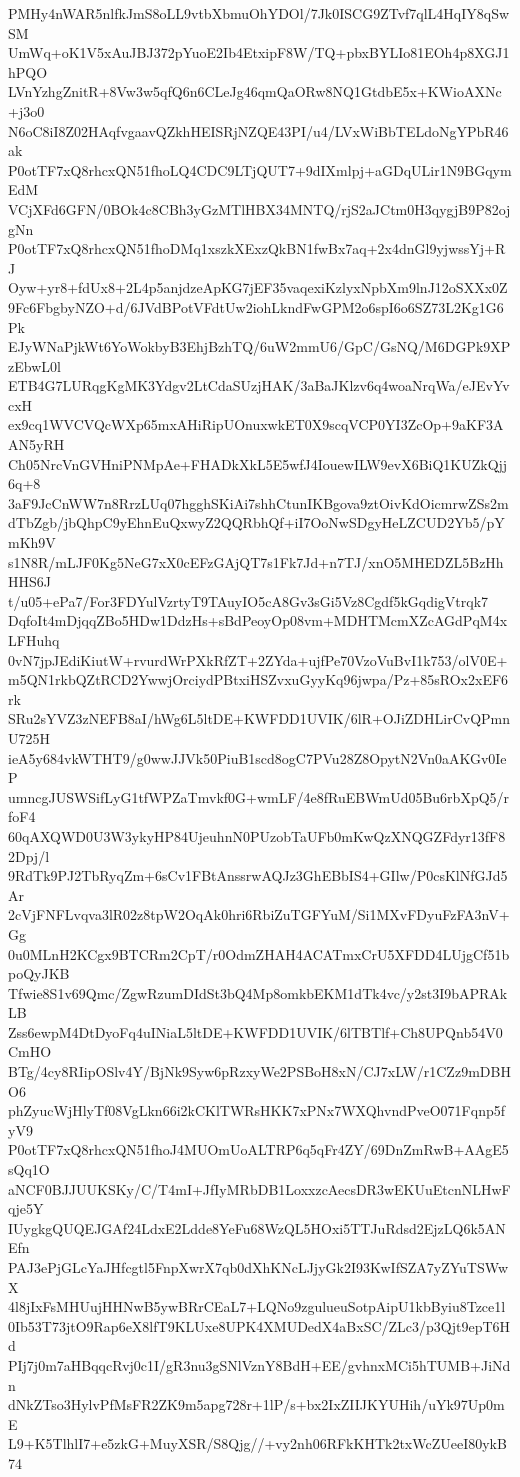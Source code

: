 PMHy4nWAR5nlfkJmS8oLL9vtbXbmuOhYDOl/7Jk0ISCG9ZTvf7qlL4HqIY8qSwSM
UmWq+oK1V5xAuJBJ372pYuoE2Ib4EtxipF8W/TQ+pbxBYLIo81EOh4p8XGJ1hPQO
LVnYzhgZnitR+8Vw3w5qfQ6n6CLeJg46qmQaORw8NQ1GtdbE5x+KWioAXNc+j3o0
N6oC8iI8Z02HAqfvgaavQZkhHEISRjNZQE43PI/u4/LVxWiBbTELdoNgYPbR46ak
P0otTF7xQ8rhcxQN51fhoLQ4CDC9LTjQUT7+9dIXmlpj+aGDqULir1N9BGqymEdM
VCjXFd6GFN/0BOk4c8CBh3yGzMTlHBX34MNTQ/rjS2aJCtm0H3qygjB9P82ojgNn
P0otTF7xQ8rhcxQN51fhoDMq1xszkXExzQkBN1fwBx7aq+2x4dnGl9yjwssYj+RJ
Oyw+yr8+fdUx8+2L4p5anjdzeApKG7jEF35vaqexiKzlyxNpbXm9lnJ12oSXXx0Z
9Fc6FbgbyNZO+d/6JVdBPotVFdtUw2iohLkndFwGPM2o6spI6o6SZ73L2Kg1G6Pk
EJyWNaPjkWt6YoWokbyB3EhjBzhTQ/6uW2mmU6/GpC/GsNQ/M6DGPk9XPzEbwL0l
ETB4G7LURqgKgMK3Ydgv2LtCdaSUzjHAK/3aBaJKlzv6q4woaNrqWa/eJEvYvcxH
ex9cq1WVCVQcWXp65mxAHiRipUOnuxwkET0X9scqVCP0YI3ZcOp+9aKF3AAN5yRH
Ch05NrcVnGVHniPNMpAe+FHADkXkL5E5wfJ4IouewILW9evX6BiQ1KUZkQjj6q+8
3aF9JcCnWW7n8RrzLUq07hgghSKiAi7shhCtunIKBgova9ztOivKdOicmrwZSs2m
dTbZgb/jbQhpC9yEhnEuQxwyZ2QQRbhQf+iI7OoNwSDgyHeLZCUD2Yb5/pYmKh9V
s1N8R/mLJF0Kg5NeG7xX0cEFzGAjQT7s1Fk7Jd+n7TJ/xnO5MHEDZL5BzHhHHS6J
t/u05+ePa7/For3FDYulVzrtyT9TAuyIO5cA8Gv3sGi5Vz8Cgdf5kGqdigVtrqk7
DqfoIt4mDjqqZBo5HDw1DdzHs+sBdPeoyOp08vm+MDHTMcmXZcAGdPqM4xLFHuhq
0vN7jpJEdiKiutW+rvurdWrPXkRfZT+2ZYda+ujfPe70VzoVuBvI1k753/olV0E+
m5QN1rkbQZtRCD2YwwjOrciydPBtxiHSZvxuGyyKq96jwpa/Pz+85sROx2xEF6rk
SRu2sYVZ3zNEFB8aI/hWg6L5ltDE+KWFDD1UVIK/6lR+OJiZDHLirCvQPmnU725H
ieA5y684vkWTHT9/g0wwJJVk50PiuB1scd8ogC7PVu28Z8OpytN2Vn0aAKGv0IeP
umncgJUSWSifLyG1tfWPZaTmvkf0G+wmLF/4e8fRuEBWmUd05Bu6rbXpQ5/rfoF4
60qAXQWD0U3W3ykyHP84UjeuhnN0PUzobTaUFb0mKwQzXNQGZFdyr13fF82Dpj/l
9RdTk9PJ2TbRyqZm+6sCv1FBtAnssrwAQJz3GhEBbIS4+GIlw/P0csKlNfGJd5Ar
2cVjFNFLvqva3lR02z8tpW2OqAk0hri6RbiZuTGFYuM/Si1MXvFDyuFzFA3nV+Gg
0u0MLnH2KCgx9BTCRm2CpT/r0OdmZHAH4ACATmxCrU5XFDD4LUjgCf51bpoQyJKB
Tfwie8S1v69Qmc/ZgwRzumDIdSt3bQ4Mp8omkbEKM1dTk4vc/y2st3I9bAPRAkLB
Zss6ewpM4DtDyoFq4uINiaL5ltDE+KWFDD1UVIK/6lTBTlf+Ch8UPQnb54V0CmHO
BTg/4cy8RIipOSlv4Y/BjNk9Syw6pRzxyWe2PSBoH8xN/CJ7xLW/r1CZz9mDBHO6
phZyucWjHlyTf08VgLkn66i2kCKlTWRsHKK7xPNx7WXQhvndPveO071Fqnp5fyV9
P0otTF7xQ8rhcxQN51fhoJ4MUOmUoALTRP6q5qFr4ZY/69DnZmRwB+AAgE5sQq1O
aNCF0BJJUUKSKy/C/T4mI+JfIyMRbDB1LoxxzcAecsDR3wEKUuEtcnNLHwFqje5Y
IUygkgQUQEJGAf24LdxE2Ldde8YeFu68WzQL5HOxi5TTJuRdsd2EjzLQ6k5ANEfn
PAJ3ePjGLcYaJHfcgtl5FnpXwrX7qb0dXhKNcLJjyGk2I93KwIfSZA7yZYuTSWwX
4l8jIxFsMHUujHHNwB5ywBRrCEaL7+LQNo9zgulueuSotpAipU1kbByiu8Tzce1l
0Ib53T73jtO9Rap6eX8lfT9KLUxe8UPK4XMUDedX4aBxSC/ZLc3/p3Qjt9epT6Hd
PIj7j0m7aHBqqcRvj0c1I/gR3nu3gSNlVznY8BdH+EE/gvhnxMCi5hTUMB+JiNdn
dNkZTso3HylvPfMsFR2ZK9m5apg728r+1lP/s+bx2IxZIIJKYUHih/uYk97Up0mE
L9+K5TlhlI7+e5zkG+MuyXSR/S8Qjg//+vy2nh06RFkKHTk2txWcZUeeI80ykB74
